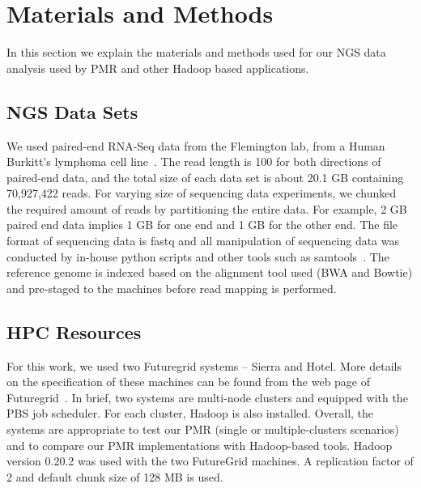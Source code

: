 \documentclass{acm_proc_article-sp}
\begin{document}
\section{Materials and Methods}\label{sec:materials_and_methods} 

In this section we explain the materials and methods used for our NGS data analysis used by PMR and other Hadoop based applications.

\subsection{NGS Data Sets}
We used paired-end RNA-Seq data from the Flemington lab, from a Human
Burkitt's lymphoma cell line~\cite{erik_2010}. The read length is 100
for both directions of paired-end data, and the total size of each
data set is about 20.1 GB containing 70,927,422 reads.  For varying
size of sequencing data experiments, we chunked the required amount of
reads by partitioning the entire data.  For example, 2 GB paired end
data implies 1 GB for one end and 1 GB for the other end.  The file
format of sequencing data is fastq and all manipulation of sequencing
data was conducted by in-house python scripts and other tools such as
samtools~\cite{samtools}. The reference genome is indexed based on the alignment tool
used (BWA and Bowtie) and pre-staged to the machines before read mapping is performed.

\subsection{HPC Resources}

For this work, we used two Futuregrid systems -- Sierra and Hotel.
More details on the specification of these machines can be found from
the web page of Futuregrid~\cite{futuregrid_url}.  In brief, two
systems are multi-node clusters and equipped with the PBS job
scheduler.  For each cluster, Hadoop is also installed.  Overall, the systems are appropriate to
test our PMR (single or multiple-clusters scenarios) and to compare our PMR implementations with Hadoop-based tools. Hadoop version 0.20.2 was used with the two FutureGrid
machines. A replication factor of 2 and default chunk size of 128 MB
is used.
\end{document}
